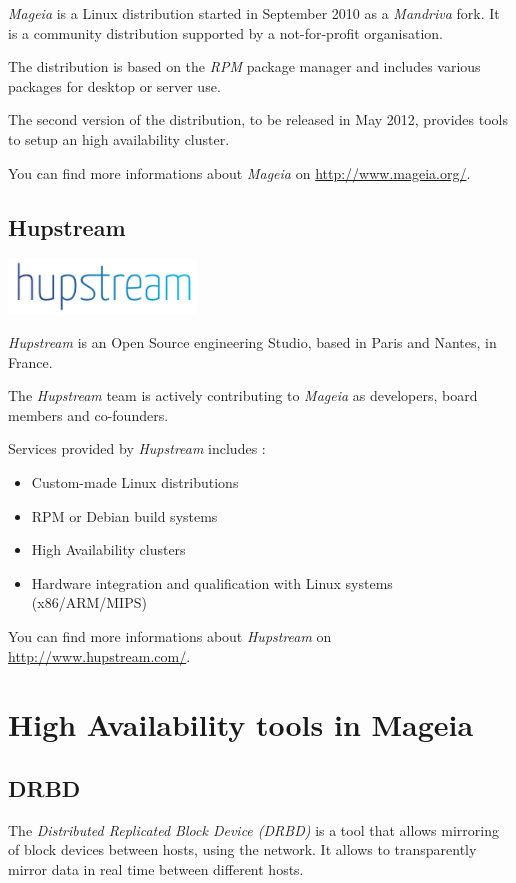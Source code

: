 \documentclass[a4paper,12pt]{article}
\begin{document}
\emph{Mageia} is a Linux distribution started in September 2010 as a
\emph{Mandriva} fork. It is a community distribution supported by a
not-for-profit organisation.

The distribution is based on the \emph{RPM} package manager and includes
various packages for desktop or server use.

The second version of the distribution, to be released in May 2012,
provides tools to setup an high availability cluster.

You can find more informations about \emph{Mageia} on \url{http://www.mageia.org/}.

\cleardoublepage
\subsection{Hupstream}
\hfill \includegraphics[width=5cm]{hupstream_logo.png}

\emph{Hupstream} is an Open Source engineering Studio, based in Paris
and Nantes, in France.

The \emph{Hupstream} team is actively contributing to \emph{Mageia} as
developers, board members and co-founders.

Services provided by \emph{Hupstream} includes :
\begin{itemize}
\item Custom-made Linux distributions
\item RPM or Debian build systems
\item High Availability clusters
\item Hardware integration and qualification with Linux systems (x86/ARM/MIPS)
\end{itemize}

You can find more informations about \emph{Hupstream} on \url{http://www.hupstream.com/}.

\cleardoublepage
\section{High Availability tools in Mageia}
\subsection{DRBD}
The \emph{Distributed Replicated Block Device (DRBD)} is a tool that
allows mirroring of block devices between hosts, using the network. It
allows to transparently mirror data in real time between different hosts.
\end{document}
